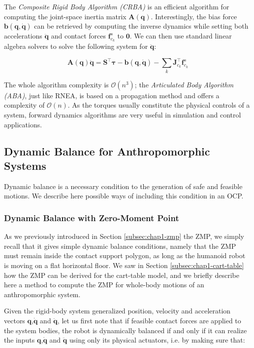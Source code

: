 The \emph{Composite Rigid Body Algorithm (CRBA)} is an efficient
algorithm for computing the joint-space inertia matrix
$\mathbf{A}(\mathbf{q})$. Interestingly, the bias force
$\mathbf{b}(\mathbf{q},\dot{\mathbf{q}})$ can be retrieved by computing the
inverse dynamics while setting both accelerations $\ddot{\mathbf{q}}$
and contact forces $\mathbf{f}^s_{c_k}$ to $\mathbf{0}$. We can then
use standard linear algebra solvers to solve the following system for
$\ddot{\mathbf{q}}$:

\begin{equation}
  \mathbf{A}(\mathbf{q})\ddot{\mathbf{q}} =
  \mathbf{S}^\top\boldsymbol{\tau} -
  \mathbf{b}(\mathbf{q},\dot{\mathbf{q}}) -
  \sum_k\mathbf{J}_{c_k}^\top\mathbf{f}^s_{c_k}
\end{equation}

The whole algorithm complexity is $\mathcal{O}(n^3)$; the
\emph{Articulated Body Algorithm (ABA)}, just like RNEA, is based on a
propagation method and offers a complexity of $\mathcal{O}(n)$. As the
torques usually constitute the physical controls of a system, forward
dynamics algorithms are very useful in simulation and control
applications.

\subsection{Dynamic Balance for Anthropomorphic Systems}

Dynamic balance is a necessary condition to the generation of safe and
feasible motions. We describe here possible ways of including this
condition in an OCP.

\subsubsection{Dynamic Balance with Zero-Moment Point}

As we previously introduced in Section \ref{subsec:chap1-zmp} the ZMP,
we simply recall that it gives simple dynamic balance conditions,
namely that the ZMP must remain inside the contact support polygon, as
long as the humanoid robot is moving on a flat horizontal floor. We
saw in Section \ref{subsec:chap1-cart-table} how the ZMP can be
derived for the cart-table model, and we briefly describe here a
method to compute the ZMP for whole-body motions of an anthropomorphic
system.

Given the rigid-body system generalized position, velocity and
acceleration vectors $\mathbf{q}$,$\dot{\mathbf{q}}$ and
$\ddot{\mathbf{q}}$, let us first note that if feasible contact forces
are applied to the system bodies, the robot is dynamically balanced if
and only if it can realize the inputs $\mathbf{q}$,$\dot{\mathbf{q}}$
and $\ddot{\mathbf{q}}$ using only its physical actuators, i.e. by
making sure that:

